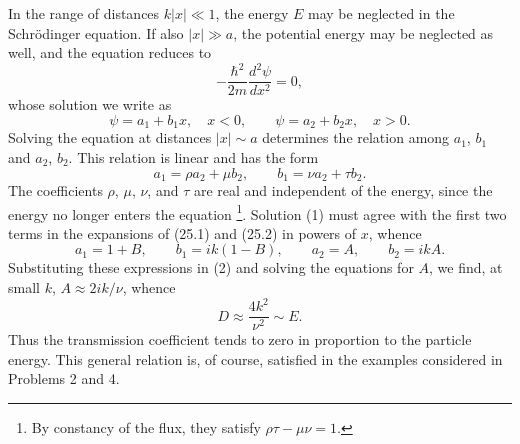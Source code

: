 \SolutionHeading
In the range of distances $k|x|\ll1$, the energy $E$ may be neglected in
the Schrödinger equation. If also $|x|\gg a$, the potential energy may be
neglected as well, and the equation reduces to
\[
  -\frac{\hbar^2}{2m}\frac{d^2\psi}{dx^2}=0,
\]
whose solution we write as
\begin{equation}
  \psi=a_1+b_1x,\quad x<0,
  \qquad \psi=a_2+b_2x,\quad x>0.
  \tag{1}
\end{equation}
Solving the equation at distances $|x|\sim a$ determines the relation among
$a_1$, $b_1$ and $a_2$, $b_2$. This relation is linear and has the form
\begin{equation}
  a_1=\rho a_2+\mu b_2,
  \qquad b_1=\nu a_2+\tau b_2.
  \tag{2}
\end{equation}
The coefficients $\rho$, $\mu$, $\nu$, and $\tau$ are real and independent
of the energy, since the energy no longer enters the equation
\footnote{By constancy of the flux, they satisfy
$\rho\tau-\mu\nu=1$.}.
Solution (1) must agree with the first two terms in the expansions of
(25.1) and (25.2) in powers of $x$, whence
\[
  a_1=1+B,\qquad b_1=ik(1-B),\qquad a_2=A,\qquad b_2=ikA.
\]
Substituting these expressions in (2) and solving the equations for $A$, we
find, at small $k$, $A\approx2ik/\nu$, whence
\[
  D\approx\frac{4k^2}{\nu^2}\sim E.
\]
Thus the transmission coefficient tends to zero in proportion to the
particle energy. This general relation is, of course, satisfied in the
examples considered in Problems 2 and 4.

